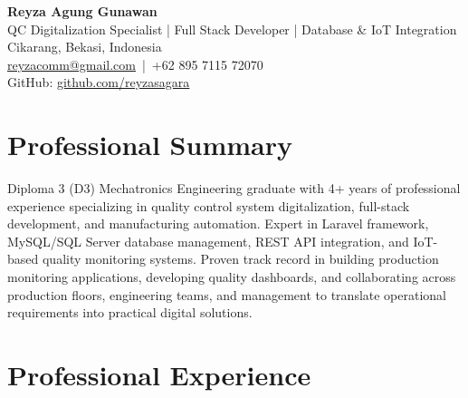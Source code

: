 \documentclass[a4paper,10pt]{article}
\begin{document}
\begin{center}
    {\LARGE \textbf{Reyza Agung Gunawan}}\\
    \vspace{4pt}
    QC Digitalization Specialist | Full Stack Developer | Database \& IoT Integration\\
    \vspace{4pt}
    Cikarang, Bekasi, Indonesia\\
    \href{mailto:reyzacomm@gmail.com}{reyzacomm@gmail.com} \,|\, +62 895 7115 72070\\
    GitHub: \href{https://github.com/reyzasagara}{github.com/reyzasagara}
\end{center}

\vspace{6pt}

\section*{Professional Summary}
Diploma 3 (D3) Mechatronics Engineering graduate with 4+ years of professional experience specializing in quality control system digitalization, full-stack development, and manufacturing automation. Expert in Laravel framework, MySQL/SQL Server database management, REST API integration, and IoT-based quality monitoring systems. Proven track record in building production monitoring applications, developing quality dashboards, and collaborating across production floors, engineering teams, and management to translate operational requirements into practical digital solutions.

\section*{Professional Experience}
\end{document}
